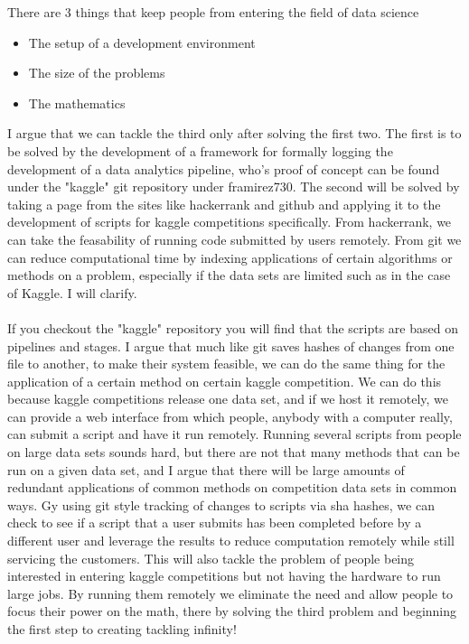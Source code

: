 \documentclass[11pt]{amsart}
\begin{document}
There are 3 things that keep people from entering the field of data science
\begin{itemize}
\item The setup of a development environment
\item The size of the problems
\item The mathematics
\end{itemize}
I argue that we can tackle the third only after solving the first two.  The first is to be solved by the development of a framework for formally logging the development of a data analytics pipeline, who's proof of concept can be found under the "kaggle" git repository under framirez730.  The second will be solved by taking a page from the sites like hackerrank and github and applying it to the development of scripts for kaggle competitions specifically.  From hackerrank, we can take the feasability of running code submitted by users remotely.  From git we can reduce computational time by indexing applications of certain algorithms or methods on a problem, especially if the data sets are limited such as in the case of Kaggle. I will clarify.\\ \\

If you checkout the "kaggle" repository you will find that the scripts are based on pipelines and stages.  I argue that much like git saves hashes  of changes from one file to another, to make their system feasible, we can do the same thing for the application of a certain method on certain kaggle competition.  We can do this because kaggle competitions release one data set, and if we host it remotely, we can provide a web interface from which people, anybody with a computer really, can submit a script and have it run remotely.  Running several scripts from people on large data sets sounds hard, but there are not that many methods that can be run on a given data set, and I argue that there will be large amounts of redundant applications of common methods on competition data sets in common ways.  Gy using git style tracking of changes to scripts via sha hashes, we can check to see if a script that a user submits has been completed before by a different user and leverage the results to reduce computation remotely while still servicing the customers.  This will also tackle the problem of people being interested in entering kaggle competitions but not having the hardware to run large jobs. By running them remotely we eliminate the need and allow people to focus their power on the math, there by solving the third problem and beginning the first step to creating tackling infinity!
\end{document}
